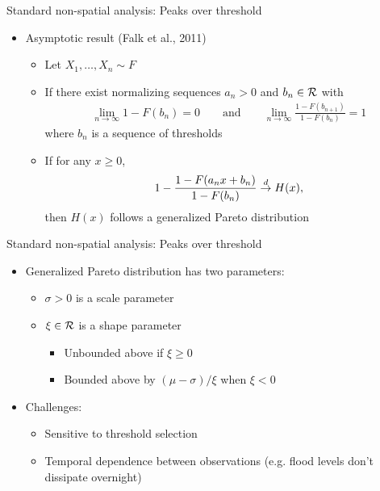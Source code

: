 \documentclass{beamer}
\begin{document}
\begin{frame}{Standard non-spatial analysis: Peaks over threshold}
  \begin{itemize} \setlength{\itemsep}{0.5em}
    \item Asymptotic result (Falk et al., 2011)
    \begin{itemize}
      \item Let $X_1, \ldots, X_n \sim F$
      \item If there exist normalizing sequences $a_n > 0$ and $b_n \in {\cal R}$ with
      \begin{align*}
        \lim_{n \rightarrow \infty} 1 - F(b_n) = 0 \qquad \text{and} \qquad \lim_{ n \rightarrow \infty} \frac{ 1 - F(b_{n+1})}{1 - F(b_n)} = 1
      \end{align*}
      where $b_n$ is a sequence of thresholds
      \item If for any $x \ge 0$,
      \begin{align*}
        1 - \frac{ 1 - F(a_n x + b_n) }{ 1 - F(b_n) } \stackrel{d}{\rightarrow} H(x),
      \end{align*}
      then $H(x)$ follows a generalized Pareto distribution
    \end{itemize}
  \end{itemize}
\end{frame}

\begin{frame}{Standard non-spatial analysis: Peaks over threshold}
  \begin{itemize} \setlength{\itemsep}{0.5em}
    \item Generalized Pareto distribution has two parameters:
    \begin{itemize}
      \item $\sigma > 0$ is a scale parameter
      \item $\xi \in {\cal R}$ is a shape parameter
      \begin{itemize}
        \item Unbounded above if $\xi \ge 0$
        \item Bounded above by $(\mu - \sigma) / \xi$ when $\xi < 0$
      \end{itemize}
    \end{itemize}
    \item Challenges:
    \begin{itemize}
      \item Sensitive to threshold selection
      \item Temporal dependence between observations (e.g. flood levels don't dissipate overnight)
    \end{itemize}
  \end{itemize}
\end{frame}
\end{document}

